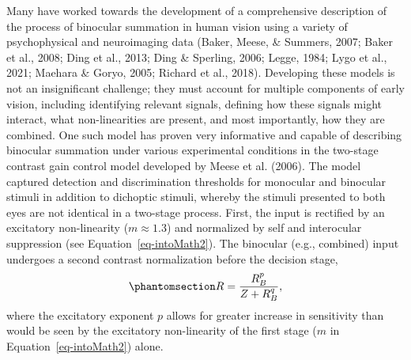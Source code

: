 \documentclass[
  12pt,
]{article}
\begin{document}
Many have worked towards the development of a comprehensive description
of the process of binocular summation in human vision using a variety of
psychophysical and neuroimaging data (Baker, Meese, \& Summers, 2007;
Baker et al., 2008; Ding et al., 2013; Ding \& Sperling, 2006; Legge,
1984; Lygo et al., 2021; Maehara \& Goryo, 2005; Richard et al., 2018).
Developing these models is not an insignificant challenge; they must
account for multiple components of early vision, including identifying
relevant signals, defining how these signals might interact, what
non-linearities are present, and most importantly, how they are
combined. One such model has proven very informative and capable of
describing binocular summation under various experimental conditions in
the two-stage contrast gain control model developed by Meese et al.
(2006). The model captured detection and discrimination thresholds for
monocular and binocular stimuli in addition to dichoptic stimuli,
whereby the stimuli presented to both eyes are not identical in a
two-stage process. First, the input is rectified by an excitatory
non-linearity (\(m \approx 1.3\)) and normalized by self and interocular
suppression (see Equation~\ref{eq-intoMath2}). The binocular (e.g.,
combined) input undergoes a second contrast normalization before the
decision stage,
\begin{equation}\phantomsection\label{eq-IntroMathSecondStage}{
R = \frac{R_B^p}{Z + R_B^q},
}\end{equation} where the excitatory exponent \(p\) allows for greater
increase in sensitivity than would be seen by the excitatory
non-linearity of the first stage (\(m\) in Equation~\ref{eq-intoMath2})
alone.
\end{document}

